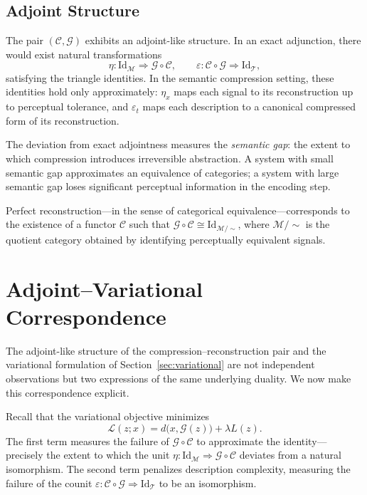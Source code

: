 \documentclass[11pt,a4paper]{article}
\theoremstyle{definition}
\theoremstyle{remark}
\begin{document}
\subsection{Adjoint Structure}

The pair $(\mathcal{C}, \mathcal{G})$ exhibits an adjoint-like structure. In an exact adjunction, there would exist natural transformations
\[
\eta : \mathrm{Id}_\mathcal{M} \Rightarrow \mathcal{G} \circ \mathcal{C}, \qquad \varepsilon : \mathcal{C} \circ \mathcal{G} \Rightarrow \mathrm{Id}_\mathcal{T},
\]
satisfying the triangle identities. In the semantic compression setting, these identities hold only approximately: $\eta_x$ maps each signal to its reconstruction up to perceptual tolerance, and $\varepsilon_t$ maps each description to a canonical compressed form of its reconstruction.

The deviation from exact adjointness measures the \emph{semantic gap}: the extent to which compression introduces irreversible abstraction. A system with small semantic gap approximates an equivalence of categories; a system with large semantic gap loses significant perceptual information in the encoding step.

Perfect reconstruction---in the sense of categorical equivalence---corresponds to the existence of a functor $\mathcal{C}$ such that $\mathcal{G} \circ \mathcal{C} \cong \mathrm{Id}_{\mathcal{M}/\!\sim}$, where $\mathcal{M}/\!\sim$ is the quotient category obtained by identifying perceptually equivalent signals.

\section{Adjoint--Variational Correspondence}
\label{sec:adjoint_variational}

The adjoint-like structure of the compression--reconstruction pair and the variational formulation of Section~\ref{sec:variational} are not independent observations but two expressions of the same underlying duality. We now make this correspondence explicit.

Recall that the variational objective minimizes
\[
\mathcal{L}(z; x) = d\big(x, \mathcal{G}(z)\big) + \lambda L(z).
\]
The first term measures the failure of $\mathcal{G} \circ \mathcal{C}$ to approximate the identity---precisely the extent to which the unit $\eta : \mathrm{Id}_\mathcal{M} \Rightarrow \mathcal{G} \circ \mathcal{C}$ deviates from a natural isomorphism. The second term penalizes description complexity, measuring the failure of the counit $\varepsilon : \mathcal{C} \circ \mathcal{G} \Rightarrow \mathrm{Id}_\mathcal{T}$ to be an isomorphism.
\end{document}
